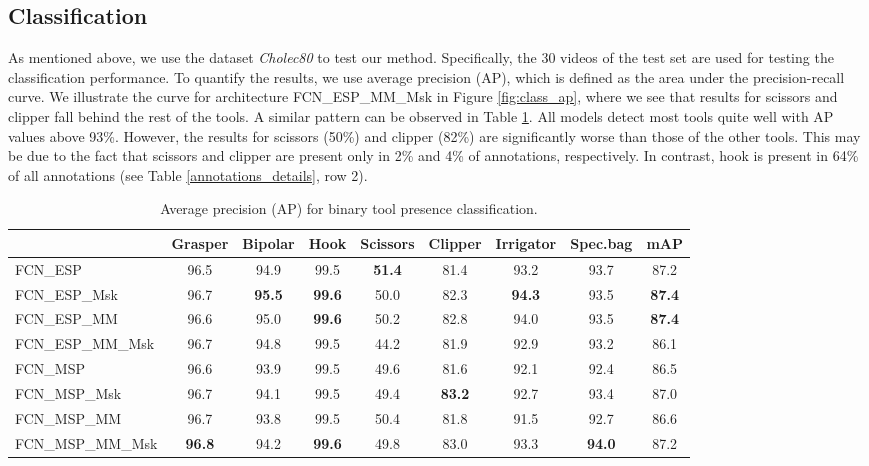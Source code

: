 \documentclass[english,runningheads,a4paper]{llncs}
\begin{document}
\subsection{Classification}
As mentioned above, we use the dataset \textit{Cholec80} to test our method. Specifically, the 30 videos of the test set are used for testing the classification performance. 
To quantify the results, we use average precision (AP), which is defined as the area under the precision-recall curve. We illustrate the curve for architecture FCN\_ESP\_MM\_Msk in Figure \ref{fig:class_ap}, where we see that results for scissors and clipper fall behind the rest of the tools.
A similar pattern can be observed in Table \ref{tab:class_ap}. All models detect most tools quite well with AP values above 93\%. However, the results for scissors (50\%) and clipper (82\%) are significantly worse than those of the other tools. This may be due to the fact that scissors and clipper are present only in 2\% and 4\% of annotations, respectively. In contrast, hook is present in 64\% of all annotations (see Table \ref{annotations_details}, row 2).
\begin{table}[t]
\centering
\begin{tabular}{|l|c|c|c|c|c|c|c|c|}
\hline
             & Grasper & Bipolar & Hook & Scissors & Clipper & Irrigator & Spec.bag & \textbf{mAP} \\ \hline
FCN\_ESP           & 96.5          & 94.9          & 99.5          & \textbf{51.4} & 81.4          & 93.2          & 93.7          & 87.2 \\ \hline
FCN\_ESP\_Msk     & 96.7          & \textbf{95.5} & \textbf{99.6} & 50.0          & 82.3          & \textbf{94.3} & 93.5          & \textbf{87.4} \\ \hline
FCN\_ESP\_MM       & 96.6          & 95.0          & \textbf{99.6} & 50.2          & 82.8          & 94.0          & 93.5          & \textbf{87.4} \\ \hline
FCN\_ESP\_MM\_Msk & 96.7          & 94.8          & 99.5          & 44.2          & 81.9          & 92.9          & 93.2          & 86.1 \\ \hline
FCN\_MSP           & 96.6          & 93.9          & 99.5          & 49.6          & 81.6          & 92.1          & 92.4          & 86.5 \\ \hline
FCN\_MSP\_Msk     & 96.7          & 94.1          & 99.5          & 49.4          & \textbf{83.2} & 92.7          & 93.4          & 87.0 \\ \hline
FCN\_MSP\_MM       & 96.7          & 93.8          & 99.5          & 50.4          & 81.8          & 91.5          & 92.7          & 86.6 \\ \hline
FCN\_MSP\_MM\_Msk & \textbf{96.8} & 94.2          & \textbf{99.6} & 49.8          & 83.0          & 93.3          & \textbf{94.0} & 87.2 \\ \hline
\end{tabular}
\smallskip
\caption{Average precision (AP) for binary tool presence classification.}
\label{tab:class_ap}
\end{table}
\end{document}
